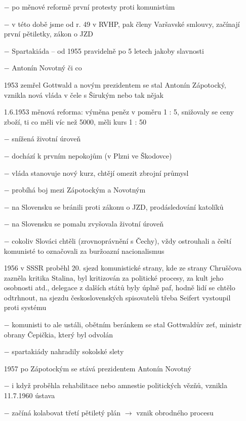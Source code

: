 \documentclass{article}
\begin{document}
\begin{itemize}
    \item[$-$] po měnové reformě první protesty proti komunistům
    \item[$-$] v této době jsme od r. 49 v RVHP, pak členy Varšavské smlouvy, začínají první pětiletky, zákon o JZD
    \item[$-$]  Spartakiáda -- od 1955 pravidelně po 5 letech jakoby slavnosti
    \item[$-$] Antonín Novotný či co
    \item[1953] zemřel Gottwald a novým prezidentem se stal Antonín Zápotocký, vznikla nová vláda v čele s Širukým nebo tak nějak
    \item[1.6.1953] měnová reforma: výměna peněz v poměru 1 : 5, snižovaly se ceny zboží, ti co měli víc než 5000, měli kurs 1 : 50
    \item[$-$] snížená životní úroveň
    \item[$-$] dochází k prvním nepokojům (v Plzni ve Škodovce)
    \item[$-$] vláda stanovuje nový kurz, chtějí omezit zbrojní průmysl
    \item[$-$] probíhá boj mezi Zápotockým a Novotným
    \item[$-$] na Slovensku se bránili proti zákonu o JZD, prodásledování katolíků
    \item[$-$] na Slovensku se pomalu zvyšovala životní úroveň
    \item[$-$] cokoliv Slováci chtěli (zrovnoprávnění s Čechy), vždy ostrouhali a čeští komunisté to označovali za buržoazní nacionalismus
    \item[1956] v SSSR proběhl 20. sjezd komunistické strany, kde ze strany Chruščova zazněla kritika Stalina, byl kritizován za politické procesy, za kult jeho osobnosti atd., delegace z dalších států byly úplně paf, hodně lidí se chtělo odtrhnout, na sjezdu československých spisovatelů třeba Seifert vystoupil proti systému
    \item[$-$] komunisti to ale ustáli, obětním beránkem se stal Gottwaldův zeť, ministr obrany Čepičkia, který byl odvolán
    \item[$-$] spartakiády nahradily sokolské slety
    \item[1957] po Zápotockým se stává prezidentem Antonín Novotný
    \item[$-$] i když proběhla rehabilitace nebo amnestie politických vězňů, vznikla 11.7.1960 ústava
    \item[$-$] začíná kolabovat třetí pětiletý plán $\rightarrow$ vznik obrodného procesu
\end{itemize}
\end{document}
